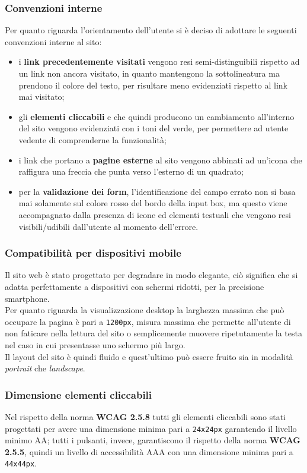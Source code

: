 \documentclass[a4paper,10pt]{article}
\begin{document}
	\subsubsection{Convenzioni interne}
	Per quanto riguarda l'orientamento dell'utente si è deciso di adottare le seguenti convenzioni interne al sito:
	\begin{itemize}
		\item i \textbf{link precedentemente visitati} vengono resi semi-distinguibili rispetto ad un link non ancora visitato, in quanto mantengono la sottolineatura ma prendono il colore del testo, per risultare meno evidenziati rispetto al link mai visitato;
		\item gli \textbf{elementi cliccabili} e che quindi producono un cambiamento all'interno del sito vengono evidenziati con i toni del verde, per permettere ad utente vedente di comprenderne la funzionalità;
		\item i link che portano a \textbf{pagine esterne} al sito vengono abbinati ad un'icona che raffigura una freccia che punta verso l'esterno di un quadrato;
		\item per la \textbf{validazione dei form}, l'identificazione del campo errato non si basa mai solamente sul colore rosso del bordo della input box, ma questo viene accompagnato dalla presenza di icone ed elementi testuali che vengono resi visibili/udibili dall'utente al momento dell'errore.
	\end{itemize}
	
	\subsubsection{Compatibilità per dispositivi mobile}
	Il sito web è stato progettato per degradare in modo elegante, ciò significa che si adatta perfettamente a dispositivi con schermi ridotti, per la precisione smartphone.\\
	Per quanto riguarda la visualizzazione desktop la larghezza massima che può occupare la pagina è pari a \texttt{1200px}, misura massima che permette all'utente di non faticare nella lettura del sito o semplicemente muovere ripetutamente la testa nel caso in cui presentasse uno schermo più largo.\\
	Il layout del sito è quindi fluido e quest'ultimo può essere fruito sia in modalità \textit{portrait} che \textit{landscape}.
	
	\subsubsection{Dimensione elementi cliccabili}
	Nel rispetto della norma \textbf{WCAG 2.5.8} tutti gli elementi cliccabili sono stati progettati per avere una dimensione minima pari a \texttt{24x24px} garantendo il livello minimo AA; tutti i pulsanti, invece, garantiscono il rispetto della norma \textbf{WCAG 2.5.5}, quindi un livello di accessibilità AAA con una dimensione minima pari a \texttt{44x44px}.
	
\end{document}
